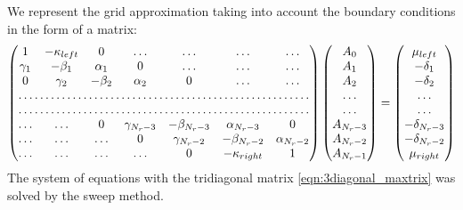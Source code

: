 \documentclass[a4paper, 12pt]{article}
\begin{document}
We represent the grid approximation taking into account the boundary conditions in the form of a matrix:
\begin{equation}
\label{eqn:3diagonal_maxtrix}
\begin{pmatrix}
1 & -\kappa_{left} & 0 & \dots & \dots & \dots & \dots\\
\gamma_1 & -\beta_1 & \alpha_1 & 0 & \dots & \dots & \dots\\
0 & \gamma_2 & -\beta_2 & \alpha_2 & 0 & \dots & \dots\\
\hdotsfor{7}\\
\hdotsfor{7}\\
\dots &\dots & 0 & \gamma_{N_r-3} & -\beta_{N_r-3} & \alpha_{N_r-3} & 0\\
\dots & \dots &\dots & 0 & \gamma_{N_r-2} & -\beta_{N_r-2} & \alpha_{N_r-2}\\
\dots &\dots &\dots &\dots & 0 & -\kappa_{right} & 1\\
\end{pmatrix}
\begin{pmatrix}
A_0 \\
A_1 \\
A_2 \\
\dots \\
\dots \\
A_{N_r-3} \\
A_{N_r-2} \\
A_{N_r-1}
\end{pmatrix}
=
\begin{pmatrix}
\mu_{left} \\
-\delta_1\\
-\delta_2\\
\dots \\
\dots \\
-\delta_{N_r-3}\\
-\delta_{N_r-2}\\
\mu_{right}
\end{pmatrix}
\end{equation}
The system of equations with the tridiagonal matrix \eqref{eqn:3diagonal_maxtrix} was solved by the sweep method.
\end{document}
